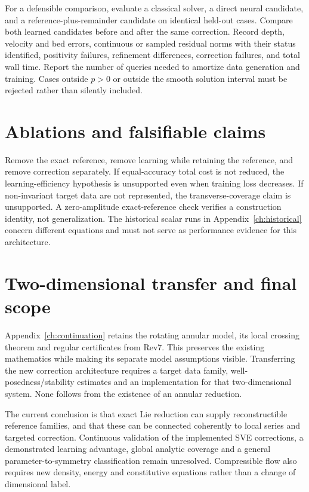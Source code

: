 \documentclass[12pt,a4paper,oneside]{report}
\numberwithin{equation}{chapter}
\theoremstyle{remark}\newtheorem{remark}[theorem]{Remark}
\begin{document}
For a defensible comparison, evaluate a classical solver, a direct neural candidate, and a reference-plus-remainder candidate on identical held-out cases. Compare both learned candidates before and after the same correction. Record depth, velocity and bed errors, continuous or sampled residual norms with their status identified, positivity failures, refinement differences, correction failures, and total wall time. Report the number of queries needed to amortize data generation and training. Cases outside $p>0$ or outside the smooth solution interval must be rejected rather than silently included.

\section{Ablations and falsifiable claims}
Remove the exact reference, remove learning while retaining the reference, and remove correction separately. If equal-accuracy total cost is not reduced, the learning-efficiency hypothesis is unsupported even when training loss decreases. If non-invariant target data are not represented, the transverse-coverage claim is unsupported. A zero-amplitude exact-reference check verifies a construction identity, not generalization. The historical scalar runs in Appendix~\ref{ch:historical} concern different equations and must not serve as performance evidence for this architecture.

\section{Two-dimensional transfer and final scope}
Appendix~\ref{ch:continuation} retains the rotating annular model, its local crossing theorem and regular certificates from Rev7. This preserves the existing mathematics while making its separate model assumptions visible. Transferring the new correction architecture requires a target data family, well-posedness/stability estimates and an implementation for that two-dimensional system. None follows from the existence of an annular reduction.

The current conclusion is that exact Lie reduction can supply reconstructible reference families, and that these can be connected coherently to local series and targeted correction. Continuous validation of the implemented SVE corrections, a demonstrated learning advantage, global analytic coverage and a general parameter-to-symmetry classification remain unresolved. Compressible flow also requires new density, energy and constitutive equations rather than a change of dimensional label.
\end{document}
